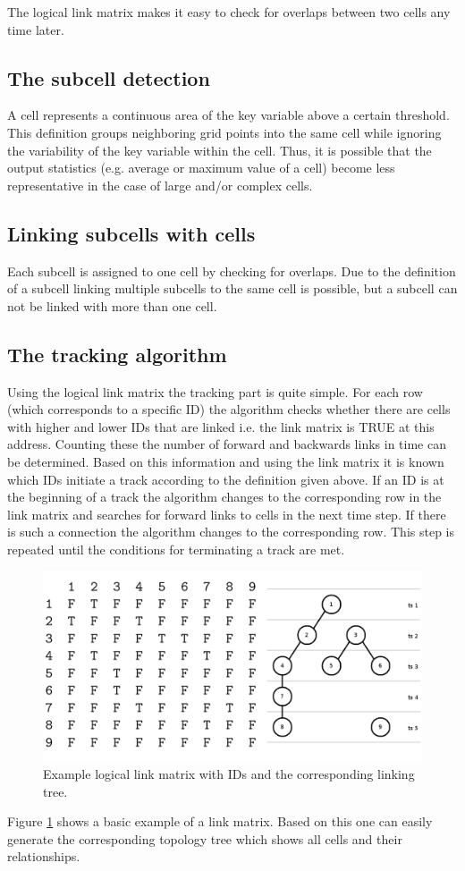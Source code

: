 \documentclass{scrartcl}
\begin{document}
The logical link matrix makes it easy to check for overlaps between two cells any time later.

\subsection{The subcell detection}
\label{sec:detectsubcells}
A cell represents a continuous area of the key variable above a certain threshold. This definition groups neighboring grid points into the same cell while ignoring the variability of the key variable within the cell. Thus, it is possible that the output statistics (e.g. average or maximum value of a cell) become less representative in the case of large and/or complex cells.

\subsection{Linking subcells with cells}
Each subcell is assigned to one cell by checking for overlaps. Due to the definition of a subcell linking multiple subcells to the same cell is possible, but a subcell can not be linked with more than one cell.

\subsection{The tracking algorithm}
Using the logical link matrix the tracking part is quite simple. For each row (which corresponds to a specific ID) the algorithm checks whether there are cells with higher and lower IDs that are linked i.e. the link matrix is TRUE at this address. Counting these the number of forward and backwards links in time can be determined. Based on this information and using the link matrix it is known which IDs initiate a track according to the definition given above. If an ID is at the beginning of a track the algorithm changes to the corresponding row in the link matrix and searches for forward links to cells in the next time step. If there is such a connection the algorithm changes to the corresponding row. This step is repeated until the conditions for terminating a track are met.
\begin{figure}[h]
	\centering
	\includegraphics[width=.8\linewidth]{links}
	\caption{Example logical link matrix with IDs and the corresponding linking tree.}
	\label{links}
\end{figure}
Figure \ref{links} shows a basic example of a link matrix. Based on this one can easily generate the corresponding topology tree which shows all cells and their relationships.
\end{document}
